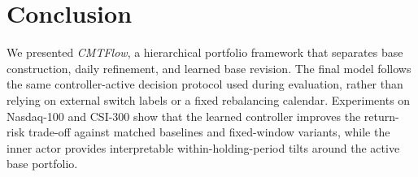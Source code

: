 \documentclass[letterpaper]{article} %
\begin{document}
\section{Conclusion}

We presented \textit{CMTFlow}, a hierarchical portfolio framework that separates base construction, daily refinement, and learned base revision. The final model follows the same controller-active decision protocol used during evaluation, rather than relying on external switch labels or a fixed rebalancing calendar. Experiments on Nasdaq-100 and CSI-300 show that the learned controller improves the return-risk trade-off against matched baselines and fixed-window variants, while the inner actor provides interpretable within-holding-period tilts around the active base portfolio.

\FloatBarrier
\raggedbottom


% 
\end{document}
